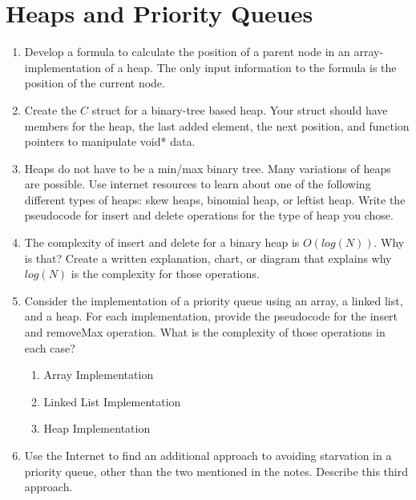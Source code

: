 \documentclass{article}
\begin{document}
\medskip
\section{Heaps and Priority Queues}

\begin{enumerate}
	\item Develop a formula to calculate the position of a parent node in an array-implementation of a heap. The only input information to the formula is the position of the current node.
	\vspace{3cm}
	\item Create the \(C\) struct for a binary-tree based heap. Your struct should have members for the heap, the last added element, the next position, and function pointers to manipulate void* data.
	\vspace{4cm}
	\item Heaps do not have to be a min/max binary tree. Many variations of heaps are possible. Use internet resources to learn about one of the following different types of heaps: skew heaps, binomial heap, or leftist heap. Write the pseudocode for insert and delete operations for the type of heap you chose.
	\vspace{6cm}
	\item The complexity of insert and delete for a binary heap is \(O(log(N))\). Why is that? Create a written explanation, chart, or diagram that explains why \(log(N)\) is the complexity for those operations.
	\vspace{6cm}
	\item Consider the implementation of a priority queue using an array, a linked list, and a heap. For each implementation, provide the pseudocode for the insert and removeMax operation. What is the complexity of those operations in each case?
		\begin{enumerate}[label=\alph*.]
			\item Array Implementation
			\vspace{6cm}
			\item Linked List Implementation
			\vspace{6cm}
			\item Heap Implementation
			\vspace{6cm}
		\end{enumerate}
	\item Use the Internet to find an additional approach to avoiding starvation in a priority queue, other than the two mentioned in the notes. Describe this third approach.
	\vspace{3cm}

\end{enumerate}
\end{document}
